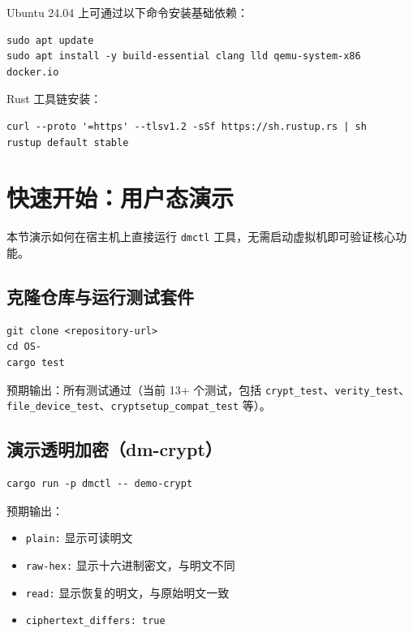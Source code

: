 Ubuntu 24.04 上可通过以下命令安装基础依赖：
\begin{lstlisting}[basicstyle=\ttfamily\small, breaklines=true]
sudo apt update
sudo apt install -y build-essential clang lld qemu-system-x86 docker.io
\end{lstlisting}

Rust 工具链安装：
\begin{lstlisting}[basicstyle=\ttfamily\small, breaklines=true]
curl --proto '=https' --tlsv1.2 -sSf https://sh.rustup.rs | sh
rustup default stable
\end{lstlisting}

\section{快速开始：用户态演示}

本节演示如何在宿主机上直接运行 \texttt{dmctl} 工具，无需启动虚拟机即可验证核心功能。

\subsection{克隆仓库与运行测试套件}

\begin{lstlisting}[basicstyle=\ttfamily\small, breaklines=true]
git clone <repository-url>
cd OS-
cargo test
\end{lstlisting}

预期输出：所有测试通过（当前 13+ 个测试，包括 \texttt{crypt\_\allowbreak test}、\texttt{verity\_\allowbreak test}、\texttt{file\_\allowbreak device\_\allowbreak test}、\texttt{cryptsetup\_\allowbreak compat\_\allowbreak test} 等）。

\subsection{演示透明加密（dm-crypt）}

\begin{lstlisting}[basicstyle=\ttfamily\small, breaklines=true]
cargo run -p dmctl -- demo-crypt
\end{lstlisting}

预期输出：
\begin{itemize}
    \item \texttt{plain:} 显示可读明文
    \item \texttt{raw-hex:} 显示十六进制密文，与明文不同
    \item \texttt{read:} 显示恢复的明文，与原始明文一致
    \item \texttt{ciphertext\_\allowbreak differs: true}
\end{itemize}

